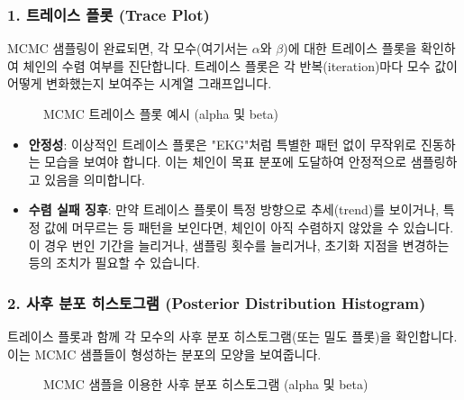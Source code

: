 \documentclass[11pt,a4paper]{article}
\theoremstyle{definition}
\begin{document}
\subsubsection*{1. 트레이스 플롯 (Trace Plot)}
MCMC 샘플링이 완료되면, 각 모수(여기서는 $\alpha$와 $\beta$)에 대한 트레이스 플롯을 확인하여 체인의 수렴 여부를 진단합니다. 트레이스 플롯은 각 반복(iteration)마다 모수 값이 어떻게 변화했는지 보여주는 시계열 그래프입니다.

\begin{figure}[h!]
    \centering
    \caption{MCMC 트레이스 플롯 예시 (alpha 및 beta)}
    \label{fig:mcmc_trace_plot}
\end{figure}

\begin{infobox}[title=트레이스 플롯 해석]
\begin{itemize}
    \item \textbf{안정성}: 이상적인 트레이스 플롯은 "EKG"처럼 특별한 패턴 없이 무작위로 진동하는 모습을 보여야 합니다. 이는 체인이 목표 분포에 도달하여 안정적으로 샘플링하고 있음을 의미합니다.
    \item \textbf{수렴 실패 징후}: 만약 트레이스 플롯이 특정 방향으로 추세(trend)를 보이거나, 특정 값에 머무르는 등 패턴을 보인다면, 체인이 아직 수렴하지 않았을 수 있습니다. 이 경우 번인 기간을 늘리거나, 샘플링 횟수를 늘리거나, 초기화 지점을 변경하는 등의 조치가 필요할 수 있습니다.
\end{itemize}
\end{infobox}

\subsubsection*{2. 사후 분포 히스토그램 (Posterior Distribution Histogram)}
트레이스 플롯과 함께 각 모수의 사후 분포 히스토그램(또는 밀도 플롯)을 확인합니다. 이는 MCMC 샘플들이 형성하는 분포의 모양을 보여줍니다.

\begin{figure}[h!]
    \centering
    \caption{MCMC 샘플을 이용한 사후 분포 히스토그램 (alpha 및 beta)}
    \label{fig:mcmc_posterior_hist}
\end{figure}
\end{document}
